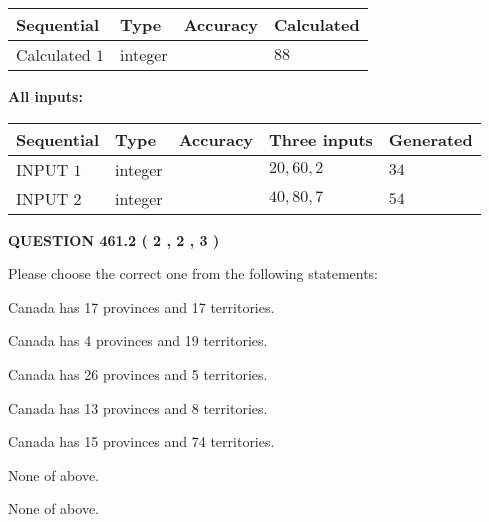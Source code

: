 \documentclass[12pt]{article}
\begin{document}
   
  
  
\noindent\begin{tabular}{|l|l|l|l|}
\hline
 Sequential & Type & Accuracy & Calculated \\ 
\hline
 
 
  Calculated $  1 $ & integer &  & 
  $ 88 $ 
 \\  \hline  
 \end{tabular}
   
   
   
   
\noindent\vspace{0.1in}\hspace{-0.08in} {\textbf{\Large{All inputs: }}}
   
   
  
  
\noindent\begin{tabular}{|l|l|l|l|l|}
\hline
 Sequential & Type & Accuracy & Three inputs & Generated \\ 
\hline
 
 
  INPUT $  1 $ & integer &  & $
 20
 , 
 60
 , 
 2
 $ & $ 34 $ 
 \\  \hline  
 
 
  INPUT $  2 $ & integer &  & $
 40
 , 
 80
 , 
 7
 $ & $ 54 $ 
 \\  \hline  
 \end{tabular}
   
   
  
\vspace{0.2in}
  
{\textbf{\Large{QUESTION
461.2 
 ( 2 , 2 , 3 )
}}}
  
  
Please choose the correct one from the following statements:
 
 
Canada has  17 provinces and  17 territories.
 
 
Canada has   4 provinces and  19 territories.
 
 
Canada has  26 provinces and  5 territories.
 
 
Canada has  13 provinces and  8 territories.
 
 
Canada has  15 provinces and  74 territories.
 
 
 None of above.
 
 
\noindent{}
 
 
 None of above.
 
\end{document}
